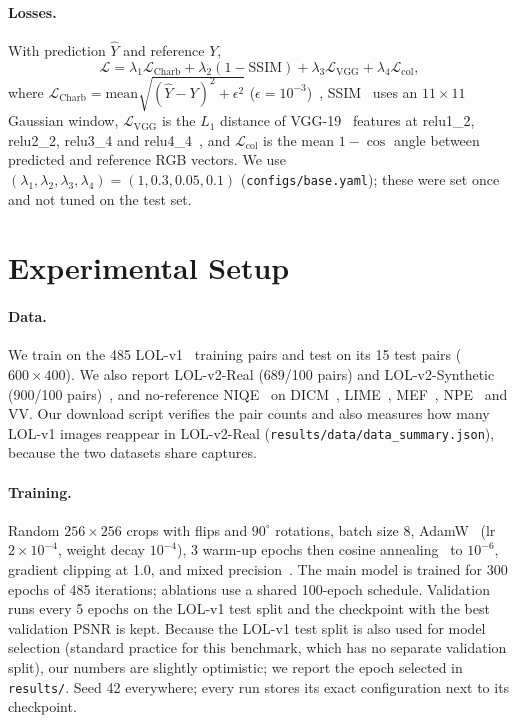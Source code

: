 \documentclass[10pt,twocolumn,letterpaper]{article}
\begin{document}
\paragraph{Losses.} With prediction $\hat{Y}$ and reference $Y$,
\begin{equation}
\mathcal{L}=\lambda_1\mathcal{L}_{\mathrm{Charb}}+\lambda_2(1-\mathrm{SSIM})
+\lambda_3\mathcal{L}_{\mathrm{VGG}}+\lambda_4\mathcal{L}_{\mathrm{col}},
\end{equation}
where $\mathcal{L}_{\mathrm{Charb}}=\mathrm{mean}\sqrt{(\hat Y-Y)^2+\epsilon^2}$
($\epsilon{=}10^{-3}$)~\cite{charbonnier1994two}, SSIM~\cite{wang2004image} uses an
$11\times11$ Gaussian window, $\mathcal{L}_{\mathrm{VGG}}$ is the $L_1$ distance of
VGG-19~\cite{simonyan2015very} features at relu1\_2, relu2\_2, relu3\_4 and
relu4\_4~\cite{johnson2016perceptual}, and $\mathcal{L}_{\mathrm{col}}$ is the mean
$1-\cos$ angle between predicted and reference RGB vectors. We use
$(\lambda_1,\lambda_2,\lambda_3,\lambda_4)=(1,0.3,0.05,0.1)$ (\texttt{configs/base.yaml});
these were set once and not tuned on the test set.

\section{Experimental Setup}\label{sec:protocol}
\paragraph{Data.} We train on the 485 LOL-v1~\cite{wei2018deep} training pairs
and test on its 15 test pairs ($600\times400$). We also report LOL-v2-Real
(689/100 pairs) and LOL-v2-Synthetic (900/100 pairs)~\cite{yang2021sparse},
and no-reference NIQE~\cite{mittal2013making} on DICM~\cite{lee2013contrast},
LIME~\cite{guo2017lime}, MEF~\cite{ma2015perceptual}, NPE~\cite{wang2013naturalness}
and VV. Our download script verifies the pair counts and also measures how many
LOL-v1 images reappear in LOL-v2-Real (\texttt{results/data/data\_summary.json}),
because the two datasets share captures.

\paragraph{Training.} Random $256\times256$ crops with flips and $90^\circ$
rotations, batch size 8, AdamW~\cite{loshchilov2019decoupled} (lr $2\times10^{-4}$,
weight decay $10^{-4}$), 3 warm-up epochs then cosine
annealing~\cite{loshchilov2017sgdr} to $10^{-6}$, gradient clipping at 1.0,
and mixed precision~\cite{micikevicius2018mixed}. The main model is trained for
300 epochs of 485 iterations; ablations use a shared 100-epoch schedule.
Validation runs every 5 epochs on the LOL-v1 test split and the checkpoint with
the best validation PSNR is kept. Because the LOL-v1 test split is also used for
model selection (standard practice for this benchmark, which has no separate
validation split), our numbers are slightly optimistic; we report the epoch
selected in \texttt{results/}. Seed 42 everywhere; every run stores its exact
configuration next to its checkpoint.
\end{document}

